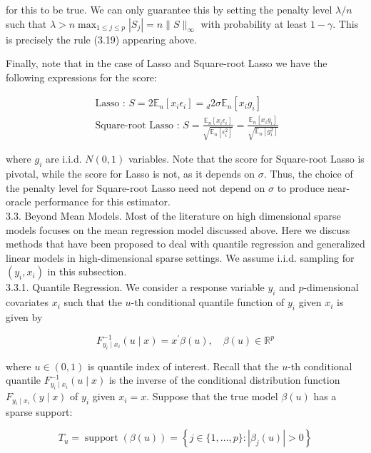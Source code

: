 \documentclass[10pt]{article}
\begin{document}
for this to be true. We can only guarantee this by setting the penalty level \(\lambda / n\) such that \(\lambda>n \max _{1 \leqslant j \leqslant p}\left|S_{j}\right|=n\|S\|_{\infty}\) with probability at least \(1-\gamma\). This is precisely the rule (3.19) appearing above.

Finally, note that in the case of Lasso and Square-root Lasso we have the following expressions for the score:

\[
\begin{array}{r}
\text { Lasso : } S=2 \mathbb{E}_{n}\left[x_{i} \epsilon_{i}\right]={ }_{d} 2 \sigma \mathbb{E}_{n}\left[x_{i} g_{i}\right] \\
\text { Square-root Lasso : } S=\frac{\mathbb{E}_{n}\left[x_{i} \epsilon_{i}\right]}{\sqrt{\mathbb{E}_{n}\left[\epsilon_{i}^{2}\right]}}=\frac{\mathbb{E}_{n}\left[x_{i} g_{i}\right]}{\sqrt{\mathbb{E}_{n}\left[g_{i}^{2}\right]}}
\end{array}
\]

where \(g_{i}\) are i.i.d. \(N(0,1)\) variables. Note that the score for Square-root Lasso is pivotal, while the score for Lasso is not, as it depends on \(\sigma\). Thus, the choice of the penalty level for Square-root Lasso need not depend on \(\sigma\) to produce near-oracle performance for this estimator.\\
3.3. Beyond Mean Models. Most of the literature on high dimensional sparse models focuses on the mean regression model discussed above. Here we discuss methods that have been proposed to deal with quantile regression and generalized linear models in high-dimensional sparse settings. We assume i.i.d. sampling for \(\left(y_{i}, x_{i}\right)\) in this subsection.\\
3.3.1. Quantile Regression. We consider a response variable \(y_{i}\) and \(p\)-dimensional covariates \(x_{i}\) such that the \(u\)-th conditional quantile function of \(y_{i}\) given \(x_{i}\) is given by

\[
F_{y_{i} \mid x_{i}}^{-1}(u \mid x)=x^{\prime} \beta(u), \quad \beta(u) \in \mathbb{R}^{p}
\]

where \(u \in(0,1)\) is quantile index of interest. Recall that the \(u\)-th conditional quantile \(F_{y_{i} \mid x_{i}}^{-1}(u \mid x)\) is the inverse of the conditional distribution function \(F_{y_{i} \mid x_{i}}(y \mid x)\) of \(y_{i}\) given \(x_{i}=x\). Suppose that the true model \(\beta(u)\) has a sparse support:

\[
T_{u}=\operatorname{support}(\beta(u))=\left\{j \in\{1, \ldots, p\}:\left|\beta_{j}(u)\right|>0\right\}
\]
\end{document}
